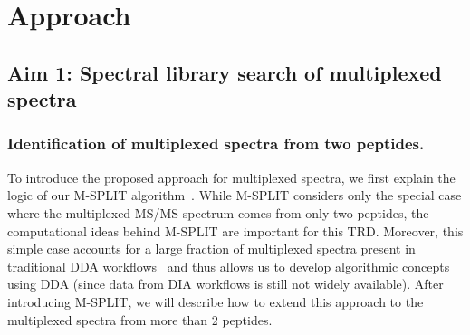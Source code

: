 \documentclass[arial,11pt]{article}
\begin{document}
\section{Approach}


\subsection{Aim 1: Spectral library search of multiplexed spectra}

\subsubsection{\bf Identification of multiplexed spectra from two peptides.}

To introduce the proposed approach for multiplexed spectra, we first explain the logic of our M-SPLIT  algorithm~\cite{wang2010msplit}. While  M-SPLIT considers only the special case where the multiplexed MS/MS spectrum comes from only two peptides, the computational ideas behind M-SPLIT are important for this TRD.
Moreover, this simple case accounts for a large fraction of multiplexed spectra present in traditional DDA workflows~\cite{pr800307m} and thus allows us to develop algorithmic concepts using DDA (since data from DIA workflows is still not widely available). After introducing M-SPLIT, we will describe how to extend this approach to the multiplexed spectra from more than 2 peptides.
\end{document}
